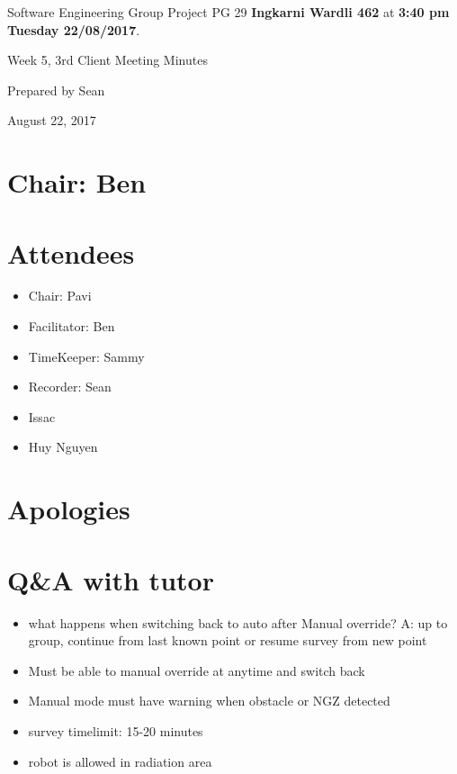 \documentclass[11pt, a4paper]{article}
\begin{document}
\noindent Software Engineering Group Project PG 29 {\bf Ingkarni Wardli 462} at {\bf 3:40 pm Tuesday 22/08/2017}.
\vspace*{10pt}
\begin{center}
\huge Week 5, 3rd Client Meeting Minutes
\end{center}
\vspace*{10pt}
\begin{center}
\huge Prepared by Sean
\end{center}
\begin{center}
\huge August 22, 2017
\end{center}
\section*{Chair: Ben}

\section{Attendees}
\begin{itemize}
\item Chair: Pavi
\item Facilitator: Ben
\item TimeKeeper: Sammy
\item Recorder: Sean
\item Issac
\item Huy Nguyen
\end{itemize}



\section{Apologies}



\section{Q\&A with tutor}

\begin{itemize}
\item what happens when switching back to auto after Manual override? A: up to group, continue from last known point or resume survey from new point
\item Must be able to manual override at anytime and switch back
\item Manual mode must have warning when obstacle or NGZ detected
\item survey timelimit: 15-20 minutes
\item robot is allowed in radiation area

\end{itemize}
\end{document}

